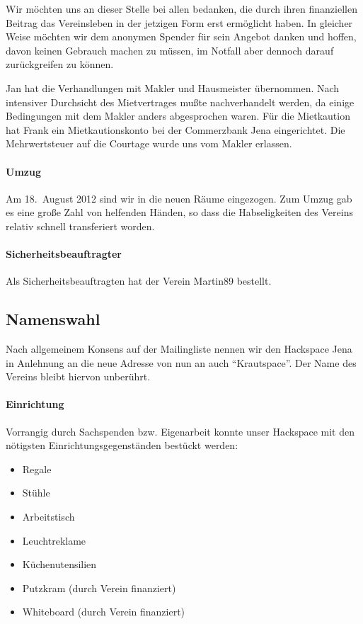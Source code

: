 \documentclass[10pt,DIV16]{scrartcl}
\begin{document}
Wir möchten uns an dieser Stelle bei allen bedanken, die durch ihren
finanziellen Beitrag das Vereinsleben in der jetzigen Form erst ermöglicht
haben.  In gleicher Weise möchten wir dem anonymen Spender für sein Angebot
danken und hoffen, davon keinen Gebrauch machen zu müssen, im Notfall aber
dennoch darauf zurückgreifen zu können.

Jan hat die Verhandlungen mit Makler und Hausmeister übernommen.  Nach
intensiver Durchsicht des Mietvertrages mußte nachverhandelt werden, da einige
Bedingungen mit dem Makler anders abgesprochen waren.  Für die Mietkaution hat
Frank ein Mietkautionskonto bei der Commerzbank Jena eingerichtet.  Die
Mehrwertsteuer auf die Courtage wurde uns vom Makler erlassen.

\paragraph{Umzug}

Am 18.~August 2012 sind wir in die neuen Räume eingezogen. Zum Umzug 
gab es eine große Zahl von helfenden Händen, so dass die 
Habseligkeiten des Vereins relativ schnell transferiert worden. 

\paragraph{Sicherheitsbeauftragter}

Als Sicherheitsbeauftragten hat der Verein Martin89 bestellt.

\subsection{Namenswahl}

Nach allgemeinem Konsens auf der Mailingliste nennen wir den Hackspace Jena in
Anlehnung an die neue Adresse von nun an auch "`Krautspace"'.  Der Name des
Vereins bleibt hiervon unberührt.

\paragraph{Einrichtung}

Vorrangig durch Sachspenden bzw. Eigenarbeit konnte unser Hackspace mit den
nötigsten Einrichtungsgegenständen bestückt werden:
\begin{itemize}
	\item Regale
	\item Stühle
	\item Arbeitstisch
	\item Leuchtreklame
	\item Küchenutensilien
	\item Putzkram (durch Verein finanziert)
	\item Whiteboard  (durch Verein finanziert)
\end{itemize}
\end{document}
